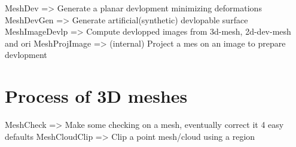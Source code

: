 

MeshDev => Generate a planar devlopment minimizing deformations
MeshDevGen => Generate artificial(synthetic) devlopable surface
MeshImageDevlp =>  Compute devlopped images from 3d-mesh, 2d-dev-mesh and ori
MeshProjImage => (internal) Project a mes on an image to prepare devlopment


\section{Process of 3D meshes}
MeshCheck => Make some checking on a mesh, eventually correct it 4 easy defaults
MeshCloudClip => Clip a point mesh/cloud  using a region




